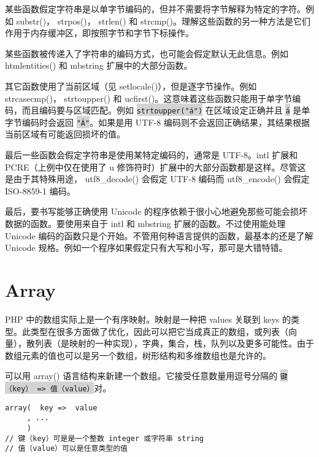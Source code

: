 \begin{compactitem}
\item 某些函数假定字符串是以单字节编码的，但并不需要将字节解释为特定的字符。例如 substr()， strpos()， strlen() 和 strcmp()。理解这些函数的另一种方法是它们作用于内存缓冲区，即按照字节和字节下标操作。
\item 某些函数被传递入了字符串的编码方式，也可能会假定默认无此信息。例如 htmlentities() 和 mbstring 扩展中的大部分函数。
\item 其它函数使用了当前区域（见 setlocale()），但是逐字节操作。例如 strcasecmp()， strtoupper() 和 ucfirst()。这意味着这些函数只能用于单字节编码，而且编码要与区域匹配。例如 \colorbox{lightgray}{\texttt{strtoupper("á")}} 在区域设定正确并且 \colorbox{lightgray}{\texttt{á}} 是单字节编码时会返回 \colorbox{lightgray}{\texttt{"Á"}}。如果是用 UTF-8 编码则不会返回正确结果，其结果根据当前区域有可能返回损坏的值。
\item 最后一些函数会假定字符串是使用某特定编码的，通常是 UTF-8。intl 扩展和 PCRE（上例中仅在使用了 u 修饰符时）扩展中的大部分函数都是这样。尽管这是由于其特殊用途， utf8\_decode() 会假定 UTF-8 编码而 utf8\_encode() 会假定 ISO-8859-1 编码。



\end{compactitem}

最后，要书写能够正确使用 Unicode 的程序依赖于很小心地避免那些可能会损坏数据的函数。要使用来自于 intl 和 mbstring 扩展的函数。不过使用能处理 Unicode 编码的函数只是个开始。不管用何种语言提供的函数，最基本的还是了解 Unicode 规格。例如一个程序如果假定只有大写和小写，那可是大错特错。


\section{Array}

PHP 中的数组实际上是一个有序映射。映射是一种把 values 关联到 keys 的类型。此类型在很多方面做了优化，因此可以把它当成真正的数组，或列表（向量），散列表（是映射的一种实现），字典，集合，栈，队列以及更多可能性。由于数组元素的值也可以是另一个数组，树形结构和多维数组也是允许的。

可以用 array() 语言结构来新建一个数组。它接受任意数量用逗号分隔的 \colorbox{lightgray}{\texttt{键（key） => 值（value）}}对。

\begin{verbatim}
array(  key =>  value
     , ...
     )
// 键（key）可是是一个整数 integer 或字符串 string
// 值（value）可以是任意类型的值
\end{verbatim}

